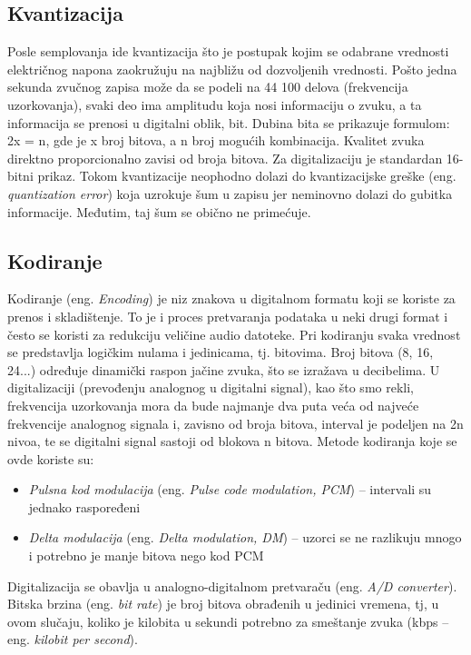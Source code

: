 \documentclass[a4paper]{article}
\begin{document}
    \subsection{Kvantizacija}
    Posle semplovanja ide kvantizacija što je postupak kojim se odabrane vrednosti električnog napona zaokružuju na najbližu od dozvoljenih vrednosti. Pošto jedna sekunda zvučnog zapisa može da se podeli na 44 100 delova (frekvencija uzorkovanja), svaki deo ima amplitudu koja nosi informaciju o zvuku, a ta informacija se prenosi u digitalni oblik, bit. Dubina bita se prikazuje formulom: 2x = n, gde je x broj bitova, a n broj mogućih kombinacija. Kvalitet zvuka direktno proporcionalno zavisi od broja bitova. Za digitalizaciju je standardan 16-bitni prikaz. Tokom kvantizacije neophodno dolazi do kvantizacijske greške (eng. \textit{quantization error}) koja uzrokuje šum u zapisu jer neminovno dolazi do gubitka informacije. Međutim, taj šum se obično ne primećuje\cite{10.17632/rwbs7645hg.2}.
    
    \subsection{Kodiranje}
    Kodiranje (eng. \textit{Encoding}) je niz znakova u digitalnom formatu koji se koriste za prenos i skladištenje. To je i proces pretvaranja podataka u neki drugi format i često se koristi za redukciju veličine audio datoteke. Pri kodiranju svaka vrednost se predstavlja logičkim nulama i jedinicama, tj. bitovima. Broj bitova (8, 16, 24...) određuje dinamički raspon jačine zvuka, što se izražava u decibelima\cite{10.17632/rwbs7645hg.1}. U digitalizaciji (prevođenju analognog u digitalni signal), kao što smo rekli, frekvencija uzorkovanja mora da bude najmanje dva puta veća od najveće frekvencije analognog signala i, zavisno od broja bitova, interval je podeljen na 2n nivoa, te se digitalni signal sastoji od blokova n bitova. Metode kodiranja koje se ovde koriste su:
    \begin{itemize}
        \item \textit{Pulsna kod modulacija} (eng. \textit{Pulse code modulation, PCM}) – intervali su jednako raspoređeni
        \item \textit{Delta modulacija} (eng. \textit{Delta modulation, DM}) – uzorci se ne razlikuju mnogo i potrebno je manje bitova nego kod PCM\cite{10.17632/rwbs7645hg.3}
    \end{itemize}
    Digitalizacija se obavlja u analogno-digitalnom pretvaraču (eng. \textit{A/D converter}). Bitska brzina (eng. \textit{bit rate}) je broj bitova obrađenih u jedinici vremena, tj, u ovom slučaju, koliko je kilobita u sekundi potrebno za smeštanje zvuka (kbps – eng. \textit{kilobit per second}).
    
\end{document}
